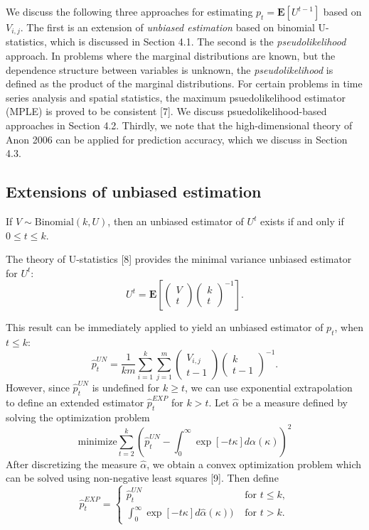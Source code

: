 \documentclass{article}
\newcommand{\E}{\textbf{E}}
\begin{document}
We discuss the following three approaches for estimating $p_t =
\E[U^{t-1}]$ based on $V_{i, j}$.  The first is an extension of \emph{unbiased
  estimation} based on binomial U-statistics, which is discussed in
Section 4.1.  The second is the \emph{pseudolikelihood} approach.  In
problems where the marginal distributions are known, but the
dependence structure between variables is unknown, the
\emph{pseudolikelihood} is defined as the product of the marginal
distributions.  For certain problems in time series analysis and
spatial statistics, the maximum psuedolikelihood estimator (MPLE) is
proved to be consistent [7].  We discuss psuedolikelihood-based
approaches in Section 4.2.  Thirdly, we note that the high-dimensional
theory of Anon 2006 can be applied for prediction accuracy, which we discuss in Section 4.3.

\subsection{Extensions of unbiased estimation}

If $V \sim \text{Binomial}(k, U)$, then an unbiased estimator of $U^t$ exists
if and only if $0 \leq t \leq k$.

The theory of U-statistics [8] provides the minimal variance unbiased estimator for $U^t$:
\[
U^t = \E\left[\begin{pmatrix}
V \\ t
\end{pmatrix}
\begin{pmatrix}
k \\ t
\end{pmatrix}^{-1}\right].
\]

This result can be immediately applied to yield an unbiased estimator of $p_t$, when $t \leq k$:
\begin{equation}\label{eq:ustat}
\hat{p}_t^{UN} =  \frac{1}{km}\sum_{i=1}^k\sum_{j=1}^{m} \begin{pmatrix}
V_{i, j} \\ t-1
\end{pmatrix}
\begin{pmatrix}
k \\ t-1
\end{pmatrix}^{-1}.
\end{equation}
However, since $\hat{p}_t^{UN}$ is undefined for $k \geq t$, we can use exponential extrapolation
to define an extended estimator $\hat{p}_t^{EXP}$ for $k > t$.
Let $\hat{\alpha}$ be a measure defined by solving the optimization problem
\[
\text{minimize} \sum_{t=2}^{k} \left(\hat{p}_t^{UN} - \int_0^\infty \exp[-t\kappa] d\alpha(\kappa)\right)^2
\]
After discretizing the measure $\hat{\alpha}$, we obtain a convex optimization problem
which can be solved using non-negative least squares [9].
Then define
\[
\hat{p}_t^{EXP} = \begin{cases}
\hat{p}_t^{UN}&\text{ for }t \leq k,\\
\int_0^\infty \exp[-t\kappa] d\hat{\alpha}(\kappa))&\text{ for }t > k.
\end{cases}
\]
\end{document}
